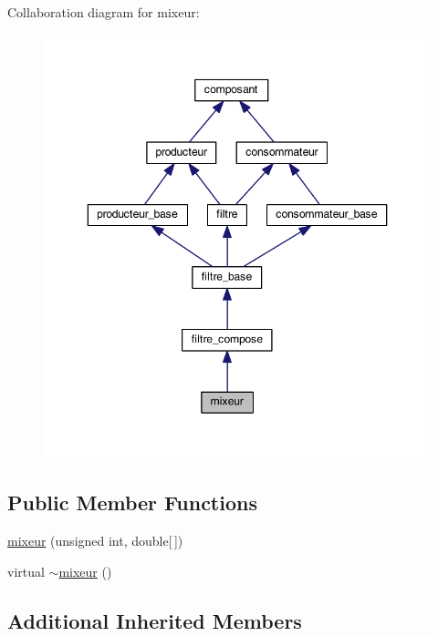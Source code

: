Collaboration diagram for mixeur\-:
\nopagebreak
\begin{figure}[H]
\begin{center}
\leavevmode
\includegraphics[width=346pt]{classmixeur__coll__graph}
\end{center}
\end{figure}
\subsection*{Public Member Functions}
\begin{DoxyCompactItemize}
\item 
\hyperlink{classmixeur_ae3a11b414ebfcd7198e87dec592da52e}{mixeur} (unsigned int, double\mbox{[}$\,$\mbox{]})
\item 
virtual \hyperlink{classmixeur_a4a9a96a4179a757e20ec3863b157f68a}{$\sim$mixeur} ()
\end{DoxyCompactItemize}
\subsection*{Additional Inherited Members}


